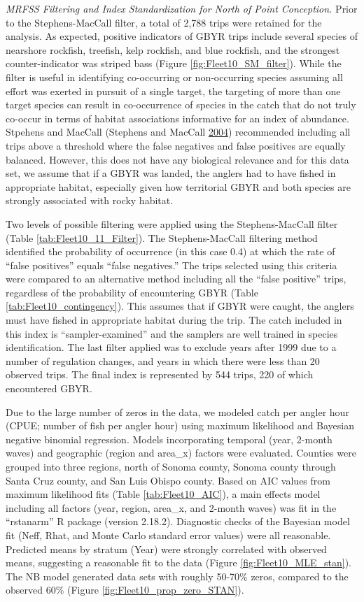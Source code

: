 \documentclass[12pt,]{article}
\begin{document}
\emph{MRFSS Filtering and Index Standardization for North of Point
Conception.} Prior to the Stephens-MacCall filter, a total of 2,788
trips were retained for the analysis. As expected, positive indicators
of GBYR trips include several species of nearshore rockfish, treefish,
kelp rockfish, and blue rockfish, and the strongest counter-indicator
was striped bass (Figure \ref{fig:Fleet10_SM_filter}). While the filter
is useful in identifying co-occurring or non-occurring species assuming
all effort was exerted in pursuit of a single target, the targeting of
more than one target species can result in co-occurrence of species in
the catch that do not truly co-occur in terms of habitat associations
informative for an index of abundance. Stpehens and MacCall (Stephens
and MacCall \protect\hyperlink{ref-Stephens2004}{2004}) recommended
including all trips above a threshold where the false negatives and
false positives are equally balanced. However, this does not have any
biological relevance and for this data set, we assume that if a GBYR was
landed, the anglers had to have fished in appropriate habitat,
especially given how territorial GBYR and both species are strongly
associated with rocky habitat.

Two levels of possible filtering were applied using the Stephens-MacCall
filter (Table \ref{tab:Fleet10_11_Filter}). The Stephens-MacCall
filtering method identified the probability of occurrence (in this case
0.4) at which the rate of ``false positives'' equals ``false
negatives.'' The trips selected using this criteria were compared to an
alternative method including all the ``false positive'' trips,
regardless of the probability of encountering GBYR (Table
\ref{tab:Fleet10_contingency}). This assumes that if GBYR were caught,
the anglers must have fished in appropriate habitat during the trip. The
catch included in this index is ``sampler-examined'' and the samplers
are well trained in species identification. The last filter applied was
to exclude years after 1999 due to a number of regulation changes, and
years in which there were less than 20 observed trips. The final index
is represented by 544 trips, 220 of which encountered GBYR.

Due to the large number of zeros in the data, we modeled catch per
angler hour (CPUE; number of fish per angler hour) using maximum
likelihood and Bayesian negative binomial regression. Models
incorporating temporal (year, 2-month waves) and geographic (region and
area\_x) factors were evaluated. Counties were grouped into three
regions, north of Sonoma county, Sonoma county through Santa Cruz
county, and San Luis Obispo county. Based on AIC values from maximum
likelihood fits (Table \ref{tab:Fleet10_AIC}), a main effects model
including all factors (year, region, area\_x, and 2-month waves) was fit
in the ``rstanarm'' R package (version 2.18.2). Diagnostic checks of the
Bayesian model fit (Neff, Rhat, and Monte Carlo standard error values)
were all reasonable. Predicted means by stratum (Year) were strongly
correlated with observed means, suggesting a reasonable fit to the data
(Figure \ref{fig:Fleet10_MLE_stan}). The NB model generated data sets
with roughly 50-70\% zeros, compared to the observed 60\% (Figure
\ref{fig:Fleet10_prop_zero_STAN}).
\end{document}
